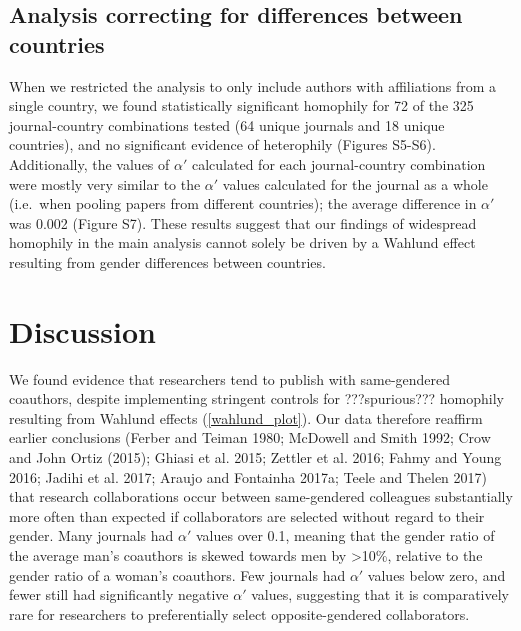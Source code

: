 \documentclass[12pt,]{article}
\begin{document}
\subsection{Analysis correcting for differences between
countries}\label{analysis-correcting-for-differences-between-countries}

When we restricted the analysis to only include authors with
affiliations from a single country, we found statistically significant
homophily for 72 of the 325 journal-country combinations tested (64
unique journals and 18 unique countries), and no significant evidence of
heterophily (Figures S5-S6). Additionally, the values of \(\alpha'\)
calculated for each journal-country combination were mostly very similar
to the \(\alpha'\) values calculated for the journal as a whole
(i.e.~when pooling papers from different countries); the average
difference in \(\alpha'\) was 0.002 (Figure S7). These results suggest
that our findings of widespread homophily in the main analysis cannot
solely be driven by a Wahlund effect resulting from gender differences
between countries.

\section{Discussion}\label{discussion}

We found evidence that researchers tend to publish with same-gendered
coauthors, despite implementing stringent controls for ???spurious???
homophily resulting from Wahlund effects (\autoref{wahlund_plot}). Our
data therefore reaffirm earlier conclusions (Ferber and Teiman 1980;
McDowell and Smith 1992; Crow and John Ortiz (2015); Ghiasi et al. 2015;
Zettler et al. 2016; Fahmy and Young 2016; Jadihi et al. 2017; Araujo
and Fontainha 2017a; Teele and Thelen 2017) that research collaborations
occur between same-gendered colleagues substantially more often than
expected if collaborators are selected without regard to their gender.
Many journals had \(\alpha'\) values over 0.1, meaning that the gender
ratio of the average man's coauthors is skewed towards men by
\textgreater{}10\%, relative to the gender ratio of a woman's coauthors.
Few journals had \(\alpha'\) values below zero, and fewer still had
significantly negative \(\alpha'\) values, suggesting that it is
comparatively rare for researchers to preferentially select
opposite-gendered collaborators.
\end{document}
